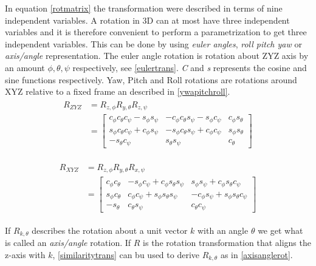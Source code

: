 In equation \eqref{rotmatrix} the transformation were described in terms of nine independent variables. A rotation in 3D can at most have three independent variables and it is therefore convenient to perform a parametrization to get three independent variables. This can be done by using \textit{euler angles}, \textit{roll pitch yaw} or \textit{axis/angle} representation. The euler angle rotation is rotation about ZYZ axis by an amount $\phi, \theta, \psi$ respectively, see \eqref{eulertrans}. \textit{C} and \textit{s} represents the cosine and sine functions respectively. Yaw, Pitch and Roll rotations are rotations around XYZ relative to a fixed frame an described in \eqref{ywapitchroll}.
\begin{align}\label{eulertrans}
\begin{split}
R_{ZYZ} &= R_{z,\phi}R_{y,\theta}R_{z,\psi} \\
&= \begin{bmatrix}
c_\phi c_\theta c_\psi - s_\phi s_\psi & -c_\phi c_\theta s_\psi - s_\phi c_\psi & c_\phi s_\theta\\ 
s_\phi c_\theta c_\psi + c_\phi s_\psi & -s_\phi c_\theta s_\psi + c_\phi c_\psi  & s_\phi s_\theta \\ 
-s_\theta c_\psi & s_\theta s_\psi & c_\theta
\end{bmatrix}
\end{split}
\end{align}


\begin{align}\label{ywapitchroll}
\begin{split}
R_{XYZ} &= R_{z,\phi}R_{y,\theta}R_{x,\psi} \\
&= \begin{bmatrix}
c_\phi c_\theta & - s_\phi c_\psi + c_\phi s_\theta s_\psi & s_\phi s_\psi + c_\phi s_\theta c_\psi \\ 
s_\phi c_\theta & c_\phi c_\psi + s_\phi s_\theta s_\psi  & - c_\phi s_\psi + s_\phi s_\theta c_\psi \\ 
-s_\theta & c_\theta s_\psi & c_\theta c_\psi
\end{bmatrix}
\end{split}
\end{align}

If $R_{k,\theta}$ describes the rotation about a unit vector $k$ with an angle $\theta$ we get what is called an \textit{axis/angle} rotation. If $R$ is the rotation transformation that aligns the z-axis with $k$, \eqref{similaritytrans} can bu used to derive $R_{k,\theta}$ as in \eqref{axisanglerot}.


